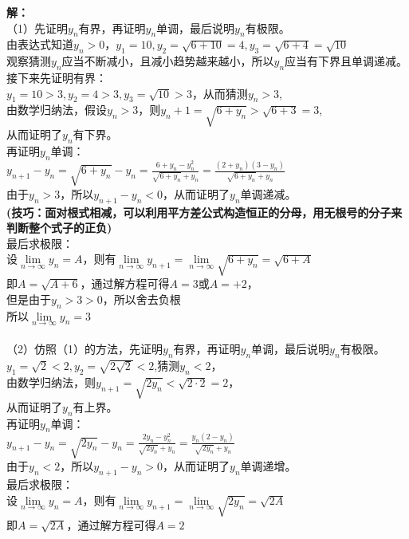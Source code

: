 \documentclass[12pt , a4paper , oneside]{ctexart}
\begin{document}
            \textbf{解：}\\
            （1）先证明$y_n$有界，再证明$y_n$单调，最后说明$y_n$有极限。\\
            由表达式知道$y_n > 0$，$y_1 = 10 , y_2 = \sqrt{6 + 10} = 4 ,y_3 = \sqrt{6 + 4} = \sqrt{10}$\\
            观察猜测$y_n$应当不断减小，且减小趋势越来越小，所以$y_n$应当有下界且单调递减。\\
            接下来先证明有界：\\
            $y_1 = 10 > 3 ,y_2 = 4 > 3 , y_3 = \sqrt{10} > 3$，从而猜测$y_n > 3$,\\
            由数学归纳法，假设$y_n > 3$，则$y_n+1 = \sqrt{6+y_n} > \sqrt{6+3} = 3$,\\
            从而证明了$y_n$有下界。\\
            再证明$y_n$单调：\\
            $y_{n+1} - y_n = \sqrt{6+y_n} - y_n = \frac{6+y_n - y_n^2}{\sqrt{6+y_n} + y_n} = \frac{(2+y_n)(3-y_n)}{\sqrt{6+y_n} + y_n}$\\
            由于$y_n > 3$，所以$y_{n+1} - y_n < 0$，从而证明了$y_n$单调递减。\\
            \textbf{(技巧：面对根式相减，可以利用平方差公式构造恒正的分母，用无根号的分子来判断整个式子的正负)}\\
            最后求极限：\\
            设$\lim\limits_{n \to \infty} y_n = A$，则有$\lim\limits_{n \to \infty} y_{n+1} = \lim\limits_{n \to \infty} \sqrt{6+y_n} = \sqrt{6+A}$\\
            即$A=\sqrt{A+6}$，通过解方程可得$A=3$或$A=+2$，\\
            但是由于$y_n > 3 > 0$，所以舍去负根\\
            所以$\lim\limits_{n \to \infty} y_n = 3$\\
             \\
            （2）仿照（1）的方法，先证明$y_n$有界，再证明$y_n$单调，最后说明$y_n$有极限。\\
            $y_1=\sqrt{2} < 2,y_2=\sqrt{2\sqrt{2}} < 2$,猜测$y_n < 2$，\\
            由数学归纳法，则$y_{n+1} = \sqrt{2y_n} < \sqrt{2 \cdot 2} = 2$，\\
            从而证明了$y_n$有上界。\\
            再证明$y_n$单调：\\
            $y_{n+1} - y_n = \sqrt{2y_n} - y_n = \frac{2y_n - y_n^2}{\sqrt{2y_n} + y_n} = \frac{y_n(2-y_n)}{\sqrt{2y_n} + y_n}$\\
            由于$y_n < 2$，所以$y_{n+1} - y_n > 0$，从而证明了$y_n$单调递增。\\
            最后求极限：\\
            设$\lim\limits_{n \to \infty} y_n = A$，则有$\lim\limits_{n \to \infty} y_{n+1} = \lim\limits_{n \to \infty} \sqrt{2y_n} = \sqrt{2A}$\\
            即$A=\sqrt{2A}$，通过解方程可得$A=2$\\
\end{document}
